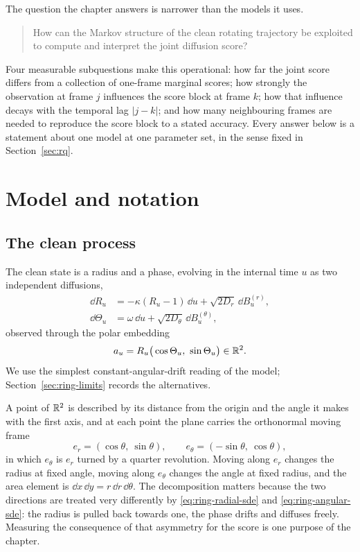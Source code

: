The question the chapter answers is narrower than the models it uses.

\begin{quote}
How can the Markov structure of the clean rotating trajectory be exploited to
compute and interpret the joint diffusion score?
\end{quote}

Four measurable subquestions make this operational: how far the joint score
differs from a collection of one-frame marginal scores; how strongly the
observation at frame $j$ influences the score block at frame $k$; how that
influence decays with the temporal lag $|j-k|$; and how many neighbouring
frames are needed to reproduce the score block to a stated accuracy. Every
answer below is a statement about one model at one parameter set, in the sense
fixed in Section~\ref{sec:rq}.

\section{Model and notation}\label{sec:ring-model}

\subsection{The clean process}

The clean state is a radius and a phase, evolving in the internal time $u$ as
two independent diffusions,
\begin{align}
  \dd R_u &= -\kappa (R_u - 1)\,\dd u + \sqrt{2 D_r}\, \dd B_u^{(r)} ,
  \label{eq:ring-radial-sde} \\
  \dd \Theta_u &= \omega\, \dd u + \sqrt{2 D_\theta}\, \dd B_u^{(\theta)} ,
  \label{eq:ring-angular-sde}
\end{align}
observed through the polar embedding
\begin{equation}
  a_u = R_u \big(\cos\Theta_u,\ \sin\Theta_u\big) \in \R^2 .
  \label{eq:ring-embedding}
\end{equation}
We use the simplest constant-angular-drift reading of the model;
Section~\ref{sec:ring-limits} records the alternatives.

A point of $\mathbb{R}^2$ is described by its distance from the origin and the angle it
makes with the first axis, and at each point the plane carries the orthonormal
moving frame
\begin{equation}
  e_r = (\cos\theta,\ \sin\theta), \qquad
  e_\theta = (-\sin\theta,\ \cos\theta) ,
  \label{eq:ring-moving-frame}
\end{equation}
in which $e_\theta$ is $e_r$ turned by a quarter revolution. Moving along $e_r$
changes the radius at fixed angle, moving along $e_\theta$ changes the angle at
fixed radius, and the area element is $\dd x\,\dd y = r\,\dd r\,\dd\theta$. The
decomposition matters because the two directions are treated very differently
by \eqref{eq:ring-radial-sde} and \eqref{eq:ring-angular-sde}: the radius is
pulled back towards one, the phase drifts and diffuses freely. Measuring the
consequence of that asymmetry for the score is one purpose of the chapter.

